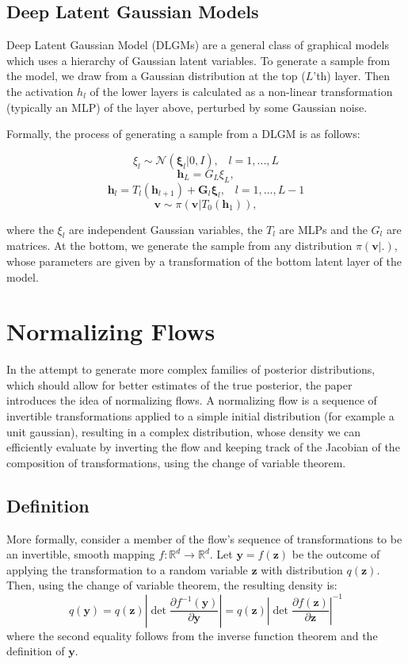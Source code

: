 \section{Deep Latent Gaussian Models}
Deep Latent Gaussian Model (DLGMs) are a general class of graphical models which uses a hierarchy of Gaussian latent variables. To generate a sample from the model, we draw from a Gaussian distribution at the top ($L$'th) layer. Then the activation $h_l$ of the lower layers is calculated as a non-linear transformation (typically an MLP) of the layer above, perturbed by some Gaussian noise.

Formally, the process of generating a sample from a DLGM is as follows:

\[ \xi_l \sim \mathcal{N}(\mathbf{\xi}_l |0, I), \;\;\; l=1,...,L \tag{1} \]
\[ \mathbf{h}_L = G_L\xi_L, \tag{2} \]
\[ \mathbf{h}_l = T_l(\mathbf{h}_{l+1}) + \mathbf{G}_l\mathbf{\xi}_l, \;\;\; l=1,...,L-1 \tag{3} \]
\[ \mathbf{v} \sim \pi(\mathbf{v}|T_0(\mathbf{h}_1)), \tag{4} \]

where the $\xi_l$ are independent Gaussian variables, the $T_l$ are MLPs and the $G_l$ are matrices. At the bottom, we generate the sample from any distribution $\pi(\mathbf{v}|.)$, whose parameters are given by a transformation of the bottom latent layer of the model.



\chapter{Normalizing Flows}
In the attempt to generate more complex families of posterior distributions, which should allow for better estimates of the true posterior, the paper introduces the idea of normalizing flows. A normalizing flow is a sequence of invertible transformations applied to a simple initial distribution (for example a unit gaussian), resulting in a complex distribution, whose density we can efficiently evaluate by inverting the flow and keeping track of the Jacobian of the composition of transformations, using the change of variable theorem.

\section{Definition}

More formally, consider a member of the flow's sequence of transformations to be an invertible, smooth mapping $f:\mathbb{R}^d \rightarrow \mathbb{R}^d$. Let $\mathbf{y}=f(\mathbf{z})$ be the outcome of applying the transformation to a random variable $\mathbf{z}$ with distribution $q(\mathbf{z})$. Then, using the change of variable theorem, the resulting density is:
\begin{equation}
q(\mathbf{y}) = q(\mathbf{z}) \left| \det \frac{\partial f^{-1}(\mathbf{y})}{\partial \mathbf{y}}  \right| = q(\mathbf{z}) \left| \det \frac{\partial f(\mathbf{z})}{\partial \mathbf{z}} \right| ^ {-1}
\end{equation}
where the second equality follows from the inverse function theorem and the definition of $\mathbf{y}$.

